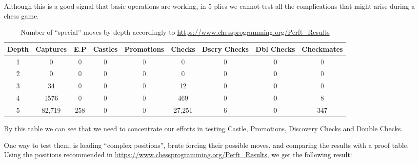 \documentclass[10pt]{article}
\begin{document}
Although this is a good signal that basic operations are working, in 5 plies we
cannot test all the complications that might arise during a chess game.

\begin{table}[h]
\center
\begin{tabular}{|c|c|c|c|c|c|c|c|c|}
\hline
\textbf{Depth}   & \textbf{Captures} & \textbf{E.P} &
\textbf{Castles} & \textbf{Promotions} & \textbf{Checks} & \textbf{Dscry
Checks} & \textbf{Dbl Checks} & \textbf{Checkmates} \\
\hline
   1  & 0 & 0 & 0 & 0 & 0 & 0 & 0 & 0 \\
\hline
   2  & 0 & 0 & 0 & 0 & 0 & 0 & 0 & 0 \\
\hline
   3  & 34 & 0 & 0 & 0 & 12 & 0 & 0 & 0 \\
\hline
   4  & 1576 & 0 & 0 & 0 & 469 & 0 & 0 & 8 \\
\hline
5  & 82,719 & 258 & 0 & 0 & 27,251 & 6 & 0 & 347 \\
\hline
\end{tabular}
\caption{Number of ``special'' moves by depth accordingly to
\url{https://www.chessprogramming.org/Perft_Results} }
\end{table}

By this table we can see that we need to concentrate our efforts in testing
Castle, Promotions, Discovery Checks and Double Checks.

One way to test them, is loading ``complex positions'', brute forcing their
possible moves, and comparing the results with a proof table. Using the
positions recommended in \url{https://www.chessprogramming.org/Perft_Results},
we get the following result:
\end{document}
